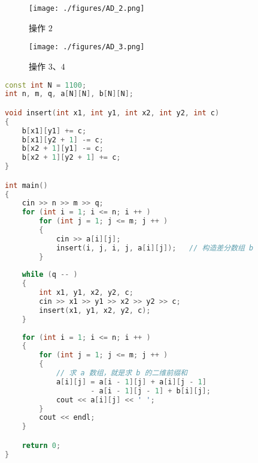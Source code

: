 \begin{figure}[ht]
\centering
\texttt{[image: ./figures/AD\_2.png]}
\caption{操作 $2$} \label{AD_fig2}
\end{figure}

\begin{figure}[ht]
\centering
\texttt{[image: ./figures/AD\_3.png]}
\caption{操作 $3$、$4$} \label{AD_fig3}
\end{figure}

\begin{lstlisting}[language=cpp]
const int N = 1100;
int n, m, q, a[N][N], b[N][N];

void insert(int x1, int y1, int x2, int y2, int c)
{
    b[x1][y1] += c;
    b[x1][y2 + 1] -= c;
    b[x2 + 1][y1] -= c;
    b[x2 + 1][y2 + 1] += c;
}

int main()
{
    cin >> n >> m >> q;
    for (int i = 1; i <= n; i ++ ) 
        for (int j = 1; j <= m; j ++ )
        {
            cin >> a[i][j];
            insert(i, j, i, j, a[i][j]);   // 构造差分数组 b
        }
        
    while (q -- )
    {
        int x1, y1, x2, y2, c;
        cin >> x1 >> y1 >> x2 >> y2 >> c;
        insert(x1, y1, x2, y2, c);
    }
    
    for (int i = 1; i <= n; i ++ ) 
    {
        for (int j = 1; j <= m; j ++ )
        {
            // 求 a 数组，就是求 b 的二维前缀和
            a[i][j] = a[i - 1][j] + a[i][j - 1] 
                    - a[i - 1][j - 1] + b[i][j];    
            cout << a[i][j] << ' ';
        }
        cout << endl;
    }

    return 0;
}
\end{lstlisting}